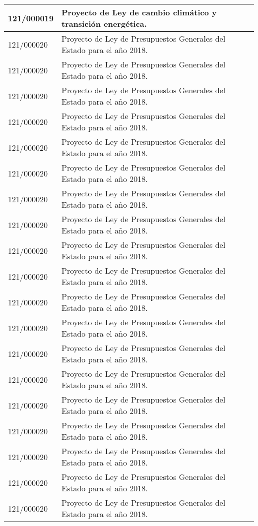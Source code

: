 {\begin{table}[H]
\begin{center}
\begin{tabularx}{\linewidth}{| l | X |}
\hline
121/000019 & Proyecto de Ley de cambio climático y transición energética. \\
\hline
121/000020 & Proyecto de Ley de Presupuestos Generales del Estado para el año 2018. \\
\hline
121/000020 & Proyecto de Ley de Presupuestos Generales del Estado para el año 2018. \\
\hline
121/000020 & Proyecto de Ley de Presupuestos Generales del Estado para el año 2018. \\
\hline
121/000020 & Proyecto de Ley de Presupuestos Generales del Estado para el año 2018. \\
\hline
121/000020 & Proyecto de Ley de Presupuestos Generales del Estado para el año 2018. \\
\hline
121/000020 & Proyecto de Ley de Presupuestos Generales del Estado para el año 2018. \\
\hline
121/000020 & Proyecto de Ley de Presupuestos Generales del Estado para el año 2018. \\
\hline
121/000020 & Proyecto de Ley de Presupuestos Generales del Estado para el año 2018. \\
\hline
121/000020 & Proyecto de Ley de Presupuestos Generales del Estado para el año 2018. \\
\hline
121/000020 & Proyecto de Ley de Presupuestos Generales del Estado para el año 2018. \\
\hline
121/000020 & Proyecto de Ley de Presupuestos Generales del Estado para el año 2018. \\
\hline
121/000020 & Proyecto de Ley de Presupuestos Generales del Estado para el año 2018. \\
\hline
121/000020 & Proyecto de Ley de Presupuestos Generales del Estado para el año 2018. \\
\hline
121/000020 & Proyecto de Ley de Presupuestos Generales del Estado para el año 2018. \\
\hline
121/000020 & Proyecto de Ley de Presupuestos Generales del Estado para el año 2018. \\
\hline
121/000020 & Proyecto de Ley de Presupuestos Generales del Estado para el año 2018. \\
\hline
121/000020 & Proyecto de Ley de Presupuestos Generales del Estado para el año 2018. \\
\hline
121/000020 & Proyecto de Ley de Presupuestos Generales del Estado para el año 2018. \\
\hline
121/000020 & Proyecto de Ley de Presupuestos Generales del Estado para el año 2018. \\

\end{tabularx}
\end{center}
\end{table}}
